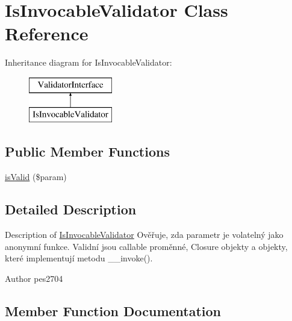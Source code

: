 \hypertarget{class_pes_1_1_validator_1_1_is_invocable_validator}{}\section{Is\+Invocable\+Validator Class Reference}
\label{class_pes_1_1_validator_1_1_is_invocable_validator}
Inheritance diagram for Is\+Invocable\+Validator\+:\begin{figure}[H]
\begin{center}
\leavevmode
\includegraphics[height=2.000000cm]{class_pes_1_1_validator_1_1_is_invocable_validator}
\end{center}
\end{figure}
\subsection*{Public Member Functions}
\begin{DoxyCompactItemize}
\item 
\mbox{\hyperlink{class_pes_1_1_validator_1_1_is_invocable_validator_a250dbda694ce9c4d0dd4e71e1df35882}{is\+Valid}} (\$param)
\end{DoxyCompactItemize}


\subsection{Detailed Description}
Description of \mbox{\hyperlink{class_pes_1_1_validator_1_1_is_invocable_validator}{Is\+Invocable\+Validator}} Ověřuje, zda parametr je volatelný jako anonymní funkce. Validní jsou callable proměnné, Closure objekty a objekty, které implementují metodu \+\_\+\+\_\+invoke().

\begin{DoxyAuthor}{Author}
pes2704 
\end{DoxyAuthor}


\subsection{Member Function Documentation}
\mbox{\label{class_pes_1_1_validator_1_1_is_invocable_validator_a250dbda694ce9c4d0dd4e71e1df35882}} 
